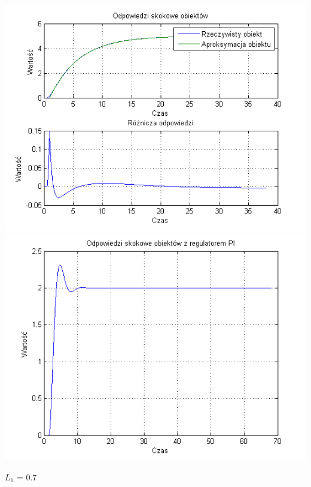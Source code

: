 \documentclass[10pt,a4paper]{article}
\begin{document}
\begin{center}
\includegraphics[scale=1]{images/jeden/skrypt_199.png}\\
\includegraphics[scale=1]{images/jeden/skrypt_200.png}\\
\end{center}
\newpage
$L_1$ = 0.7
\end{document}
